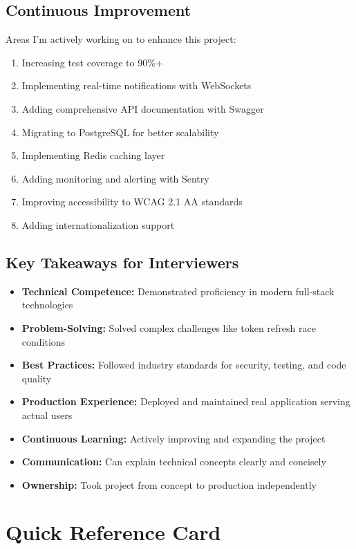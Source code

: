 \documentclass[11pt,a4paper]{article}
\begin{document}
\subsection{Continuous Improvement}
Areas I'm actively working on to enhance this project:
\begin{enumerate}[leftmargin=*]
    \item Increasing test coverage to 90\%+
    \item Implementing real-time notifications with WebSockets
    \item Adding comprehensive API documentation with Swagger
    \item Migrating to PostgreSQL for better scalability
    \item Implementing Redis caching layer
    \item Adding monitoring and alerting with Sentry
    \item Improving accessibility to WCAG 2.1 AA standards
    \item Adding internationalization support
\end{enumerate}

\subsection{Key Takeaways for Interviewers}
\begin{itemize}[leftmargin=*]
    \item \textbf{Technical Competence:} Demonstrated proficiency in modern full-stack technologies
    \item \textbf{Problem-Solving:} Solved complex challenges like token refresh race conditions
    \item \textbf{Best Practices:} Followed industry standards for security, testing, and code quality
    \item \textbf{Production Experience:} Deployed and maintained real application serving actual users
    \item \textbf{Continuous Learning:} Actively improving and expanding the project
    \item \textbf{Communication:} Can explain technical concepts clearly and concisely
    \item \textbf{Ownership:} Took project from concept to production independently
\end{itemize}

\newpage

\section{Quick Reference Card}
\end{document}
